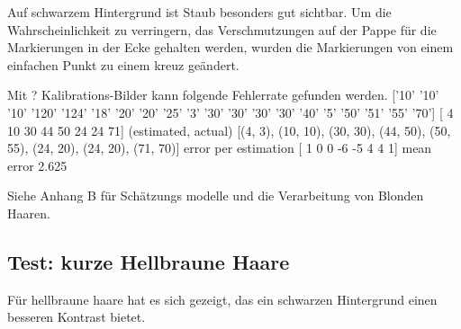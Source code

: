 \documentclass[german,a4paper, 12pt]{llncs}
\begin{document}
Auf schwarzem Hintergrund ist Staub besonders gut sichtbar. Um die Wahrscheinlichkeit zu verringern, das Verschmutzungen auf der Pappe für die Markierungen in der Ecke gehalten werden, wurden die Markierungen von einem einfachen Punkt zu einem kreuz geändert.  

Mit ? Kalibrations-Bilder kann folgende Fehlerrate gefunden werden.
['10' '10' '10' '120' '124' '18' '20' '20' '25' '3' '30' '30' '30' '30'
'40' '5' '50' '51' '55' '70']
[ 4 10 30 44 50 24 24 71]
(estimated, actual)
[(4, 3), (10, 10), (30, 30), (44, 50), (50, 55), (24, 20), (24, 20), (71, 70)]
error per estimation [ 1  0  0 -6 -5  4  4  1]
mean error 2.625

Siehe Anhang B für Schätzungs modelle und die Verarbeitung von Blonden Haaren.


\subsection{Test: kurze Hellbraune Haare}

Für hellbraune haare hat es sich gezeigt, das ein schwarzen Hintergrund einen besseren Kontrast bietet.
\end{document}
